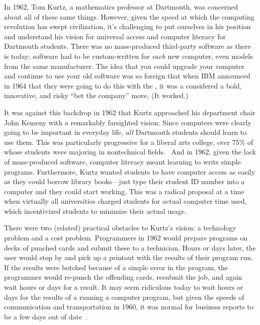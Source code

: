 In 1962, Tom Kurtz, a mathematics professor at Dartmouth, was concerned
about all of these same things.
However, given the speed at which the computing revolution has swept
civilization, it's challenging to put ourselves in his position and
understand his vision for universal access and computer literacy for
Dartmouth students.
There was no mass-produced third-party software as there is today: software
had to be custom-written for \emph{each} new computer, even models from
the same manufacturer.
The idea that you could upgrade your computer and continue to use your
old software was so foreign that when IBM announced in 1964
that they were going to do this with the ,
it was a considered a bold, innovative, and risky ``bet the company''
move.  (It worked.)

It was against this backdrop 
in 1962 that Kurtz approached
his department chair John Kemeny with a remarkably farsighted vision:
Since computers were clearly going to be important in everyday
life, \emph{all} Dartmouth students should learn to use them.  This was
particularly progressive for a liberal arts college,
over 75\% of whose students were majoring in nontechnical fields.~\cite{goto}
And in 1962, given the lack of mass-produced software,
computer literacy meant learning to
write simple programs.
Furthermore, Kurtz wanted students to have computer access as easily as
they could borrow library books---just type their student ID number into
a computer and they could start working.  This was a radical proposal at
a time when virtually all universities charged students for actual
computer time used, which incentivized students to minimize their actual
usage. 

There were two (related) practical obstacles to Kurtz's vision: a
technology problem and a cost problem.
Programmers in 1962 would prepare programs on decks of
punched cards and 
submit these to a technician.
Hours or days later, the user would stop by and pick up a printout with
the results of their program run.
If the results were botched because of a simple error in the program,
the programmer would re-punch the offending cards, resubmit the job, and
again wait hours or days for a result.
It may seem ridiculous today to wait hours or days for the results of a
running a computer program, but given the speeds of 
communication and transportation in 1960, it was normal for business
reports to be a few days out of date~\cite{ceruzzi}.

